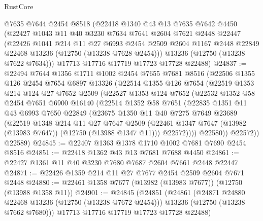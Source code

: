 \begin{lexlean}{RustCore}
\begin{coremodule}
    @7635
    @7644
    @2454
    @8518
    (@22418
      @1340
      @43
      @13
      @7635
      @7642
      @4450
      (@22427
        @1043
        @11
        @40
        @3230
        @7634
        @7641
        @2604
        @7621
        @2448
        @22447
        (@22426
          @1041
          @214
          @11
          @27
          @6993
          @2454
          @2509
          @2604
          @1167
          @2448
          @22849
          @22468
          @13236
          (@12750 (@13238 @7628 @2454)))
        @13236
        (@12750 (@13238 @7622 @7634)))
      @17713
      @17716
      @17719
      @17723
      @17728
      @22488)
@24837 := @22494
    @7644
    @1356
    @1711
    @1002
    @2454
    @7655
    @7681
    @8516
    (@22506
      @1355
      @126
      @2454
      @7654
      @6897
      @13326
      (@22514
        @1355
        @126
        @7654
        (@22519
          @1353
          @214
          @124
          @27
          @7652
          @2509
          (@22527
            @1353
            @124
            @7652
            (@22532
              @1352
              @58
              @2454
              @7651
              @6900
              @16140
              (@22514
                @1352
                @58
                @7651
                (@22835
                  @1351
                  @11
                  @43
                  @6993
                  @7650
                  @22849
                  (@23675
                    @1350
                    @11
                    @40
                    @7275
                    @7649
                    @23689
                    (@22519
                      @1348
                      @214
                      @11
                      @27
                      @7647
                      @2509
                      (@22461 @1347 @7647 (@13982 (@13983 @7647)) (@12750 (@13988 @1347 @11)))
                      @22572))))
              @22580))
          @22572))
      @22589)
@24845 := @22407 @1363 @1378 @1710 @1002 @7681 @7690 @2454 @8516
@24851 := @22418 @1362 @43 @13 @7681 @7688 @4450
@24861 := @22427 @1361 @11 @40 @3230 @7680 @7687 @2604 @7661 @2448 @22447
@24871 := @22426 @1359 @214 @11 @27 @7677 @2454 @2509 @2604 @7671 @2448
@24880 := @22461 @1358 @7677 (@13982 (@13983 @7677)) (@12750 (@13988 @1358 @11))
@24901 := @24845
    (@24851
      (@24861
        (@24871 @24880 @22468 @13236 (@12750 (@13238 @7672 @2454)))
        @13236
        (@12750 (@13238 @7662 @7680)))
      @17713
      @17716
      @17719
      @17723
      @17728
      @22488)

\end{coremodule}
\end{lexlean}
